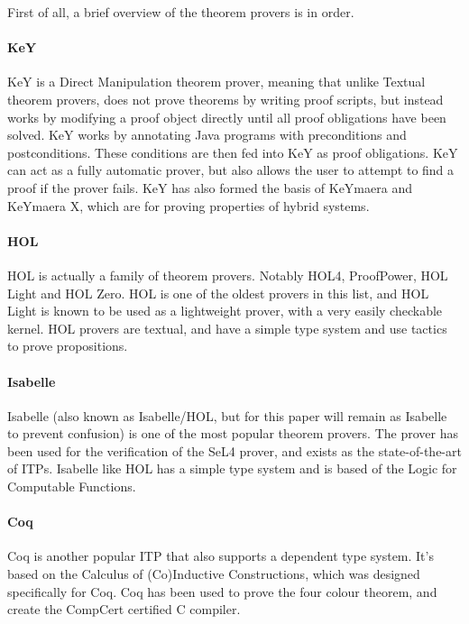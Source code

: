 \documentclass[
]{article}
\begin{document}
First of all, a brief overview of the theorem provers is in order.

\hypertarget{key}{%
\paragraph{KeY}\label{key}}

KeY is a Direct Manipulation theorem prover, meaning that unlike Textual
theorem provers, does not prove theorems by writing proof scripts, but
instead works by modifying a proof object directly until all proof
obligations have been solved. KeY works by annotating Java programs with
preconditions and postconditions. These conditions are then fed into KeY
as proof obligations. KeY can act as a fully automatic prover, but also
allows the user to attempt to find a proof if the prover fails. KeY has
also formed the basis of KeYmaera and KeYmaera X, which are for proving
properties of hybrid systems.

\hypertarget{hol}{%
\paragraph{HOL}\label{hol}}

HOL is actually a family of theorem provers. Notably HOL4, ProofPower,
HOL Light and HOL Zero. HOL is one of the oldest provers in this list,
and HOL Light is known to be used as a lightweight prover, with a very
easily checkable kernel. HOL provers are textual, and have a simple type
system and use tactics to prove propositions.

\hypertarget{isabelle}{%
\paragraph{Isabelle}\label{isabelle}}

Isabelle (also known as Isabelle/HOL, but for this paper will remain as
Isabelle to prevent confusion) is one of the most popular theorem
provers. The prover has been used for the verification of the SeL4
prover, and exists as the state-of-the-art of ITPs. Isabelle like HOL
has a simple type system and is based of the Logic for Computable
Functions.

\hypertarget{coq}{%
\paragraph{Coq}\label{coq}}

Coq is another popular ITP that also supports a dependent type system.
It's based on the Calculus of (Co)Inductive Constructions, which was
designed specifically for Coq. Coq has been used to prove the four
colour theorem, and create the CompCert certified C compiler.
\end{document}
